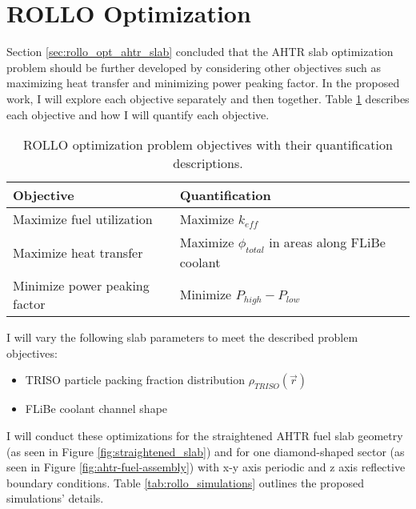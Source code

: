 \section{ROLLO Optimization}
Section \ref{sec:rollo_opt_ahtr_slab} concluded that the \gls{AHTR} slab 
optimization problem should be further developed by considering other objectives 
such as maximizing heat transfer and minimizing power peaking factor. 
In the proposed work, I will explore each objective separately and then together.
Table \ref{tab:objectives} describes each objective and how I will quantify 
each objective. 
\begin{table}[!htbp]
    \centering
    \onehalfspacing
    \caption{\acrfull{ROLLO} optimization problem objectives with their quantification 
    descriptions.}
	\label{tab:objectives}
    \footnotesize
    \begin{tabular}{p{5cm}p{7cm}}
    \hline 
    \textbf{Objective}& \textbf{Quantification}  \\
    \hline
    Maximize fuel utilization & Maximize $k_{eff}$\\ 
    Maximize heat transfer & Maximize $\phi_{total}$ in areas along FLiBe coolant \\
    Minimize power peaking factor & Minimize $P_{high}-P_{low}$ \\
    \hline
    \end{tabular}
\end{table}
I will vary the following slab parameters to meet the described problem objectives: 
\begin{itemize}
    \item \gls{TRISO} particle packing fraction distribution $\rho_{TRISO}(\vec{r})$
    \item \gls{FLiBe} coolant channel shape 
\end{itemize} 
I will conduct these optimizations for the straightened \gls{AHTR} fuel slab 
geometry (as seen in Figure \ref{fig:straightened_slab}) and for one 
diamond-shaped sector (as seen in Figure \ref{fig:ahtr-fuel-assembly}) with 
x-y axis periodic and z axis reflective boundary conditions. 
Table \ref{tab:rollo_simulations} outlines the proposed simulations' details. 

